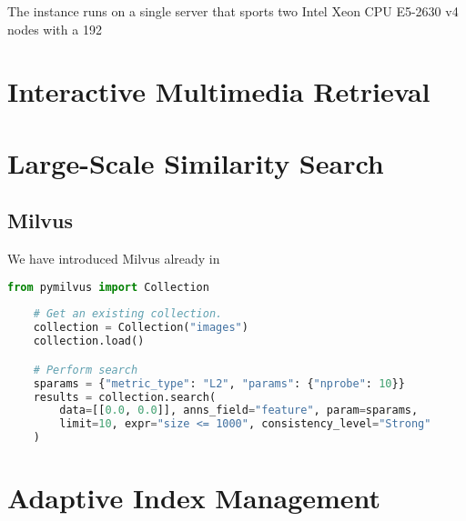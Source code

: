 The \cottontail{} instance runs on a single server that sports two Intel Xeon CPU E5-2630 v4 nodes with a \SI{192}{\giga\byte}




\section{Interactive Multimedia Retrieval}


\section{Large-Scale Similarity Search}
\subsection{Milvus}
We have introduced Milvus already in 

\begin{lstlisting}[language=Python, caption={Example of a hybrid query to Milvus in Python. The \texttt{expr} parameter can be used to specify Boolean filters. Source: https://milvus.io/}, label={listing:milvus_query}]
    from pymilvus import Collection
    
    # Get an existing collection.
    collection = Collection("images")      
    collection.load()

    # Perform search
    sparams = {"metric_type": "L2", "params": {"nprobe": 10}}
    results = collection.search(
        data=[[0.0, 0.0]], anns_field="feature", param=sparams, 
        limit=10, expr="size <= 1000", consistency_level="Strong"
    )
\end{lstlisting}

\section{Adaptive Index Management}

